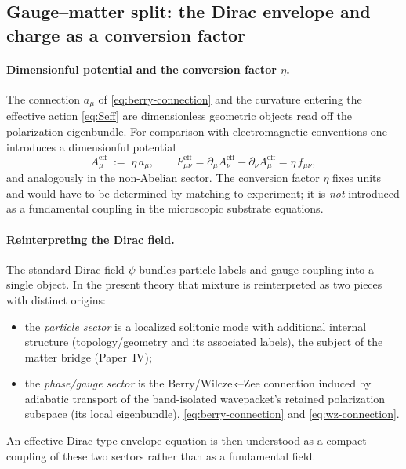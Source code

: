 \subsection{Gauge--matter split: the Dirac envelope and charge as a conversion factor}
\label{subsec:dirac-envelope}

\paragraph{Dimensionful potential and the conversion factor $\eta$.}
The connection $a_\mu$ of \eqref{eq:berry-connection} and the curvature entering the effective action
\eqref{eq:Seff} are dimensionless geometric objects read off the polarization eigenbundle.
For comparison with electromagnetic conventions one introduces a dimensionful potential
\begin{equation}
  A^{\mathrm{eff}}_\mu \;:=\; \eta\,a_\mu,
  \qquad
  F^{\mathrm{eff}}_{\mu\nu}
  = \partial_\mu A^{\mathrm{eff}}_\nu - \partial_\nu A^{\mathrm{eff}}_\mu
  = \eta\,f_{\mu\nu},
  \label{eq:eta-conversion}
\end{equation}
and analogously in the non-Abelian sector.
The conversion factor $\eta$ fixes units and would have to be determined by matching to experiment;
it is \emph{not} introduced as a fundamental coupling in the microscopic substrate equations.

\paragraph{Reinterpreting the Dirac field.}
The standard Dirac field $\psi$ bundles particle labels and gauge coupling into a single object.
In the present theory that mixture is reinterpreted as two pieces with distinct origins:
\begin{itemize}
  \item the \emph{particle sector} is a localized solitonic mode with additional internal structure
  (topology/geometry and its associated labels), the subject of the matter bridge (Paper~IV);
  \item the \emph{phase/gauge sector} is the Berry/Wilczek--Zee connection induced by adiabatic
  transport of the band-isolated wavepacket's retained polarization subspace (its local
  eigenbundle), \eqref{eq:berry-connection} and \eqref{eq:wz-connection}.
\end{itemize}
An effective Dirac-type envelope equation is then understood as a compact coupling of these two
sectors rather than as a fundamental field.

